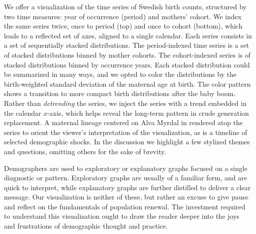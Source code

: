 We offer a visualization of the time series of Swedish birth counts, structured by two time measures: year of occurrence (period) and mothers' cohort. We index the same series twice, once to period (top) and once to cohort (bottom), which leads to a reflected set of axes, aligned to a single calendar. Each series consists in a set of sequentially stacked distributions. The period-indexed time series is a set of stacked distributions binned by mother cohorts. The cohort-indexed series is of stacked distributions binned by occurrence years. Each stacked distribution could be summarized in many ways, and we opted to color the distributions by the birth-weighted standard deviation of the maternal age at birth. The color pattern shows a transition to more compact birth distributions after the baby boom. Rather than \emph{detrending} the series, we inject the series with a trend embedded in the calendar $x$-axis, which helps reveal the long-term pattern in crude generation replacement. A maternal lineage centered on Alva Myrdal in rendered atop the series to orient the viewer's interpretation of the visualization, as is a timeline of selected demographic shocks. In the discussion we highlight a few stylized themes and questions, omitting others for the sake of brevity. 

Demographers are used to exploratory or explanatory graphs focused on a single diagnostic or pattern. Exploratory graphs are usually of a familiar form, and are quick to interpret, while explanatory graphs are further distilled to deliver a clear message. Our visualization is neither of these, but rather an excuse to give pause and reflect on the fundamentals of population renewal. The investment required to understand this visualization ought to draw the reader deeper into the joys and frustrations of demographic thought and practice. 
